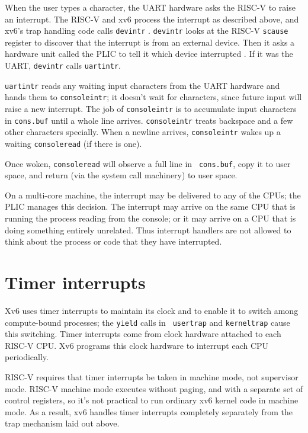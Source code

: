 When the user types a character, the UART hardware asks the RISC-V
to raise an interrupt. The RISC-V and xv6 process the interrupt
as described above, and xv6's trap handling code calls {\tt devintr}
.
{\tt devintr} looks at the RISC-V {\tt scause} register to discover that
the interrupt is from an external device.
Then it asks a hardware unit called the PLIC
\cite{riscv:priv}
to tell it which device interrupted
.
If it was the UART, {\tt devintr} calls {\tt uartintr}.

{\tt uartintr}
reads any waiting input characters from the UART hardware
and hands them to {\tt consoleintr}; it doesn't
wait for characters, since future input will raise a new interrupt.
The job of {\tt consoleintr} is to accumulate input characters in
{\tt cons.buf} 
until a whole line arrives.
{\tt consoleintr} treats backspace and a few other characters
specially.
When a newline arrives, {\tt consoleintr} wakes up a
waiting {\tt consoleread} (if there is one).

Once woken, {\tt consoleread} will observe a full line in {\tt
  cons.buf}, copy it to user space, and return (via the system call
machinery) to user space.

On a multi-core machine, the interrupt may be delivered to any of the
CPUs; the PLIC manages this decision. The interrupt may arrive on the
same CPU that is running the process reading from the console; or it
may arrive on a CPU that is doing something entirely unrelated. Thus
interrupt handlers are not allowed to think about the process or code
that they have interrupted.

\section{Timer interrupts}

Xv6 uses timer interrupts to maintain its clock and to enable it to
switch among compute-bound processes; the {\tt yield} calls in {\tt
  usertrap} and {\tt kerneltrap} cause this switching. Timer
interrupts come from clock hardware attached to each RISC-V CPU. Xv6
programs this clock hardware to interrupt each CPU periodically.

RISC-V requires that timer interrupts be taken in machine mode, not
supervisor mode. RISC-V machine mode executes without paging, and with
a separate set of control registers, so it's not practical to run
ordinary xv6 kernel code in machine mode. As a result, xv6 handles
timer interrupts completely separately from the trap mechanism laid
out above.

